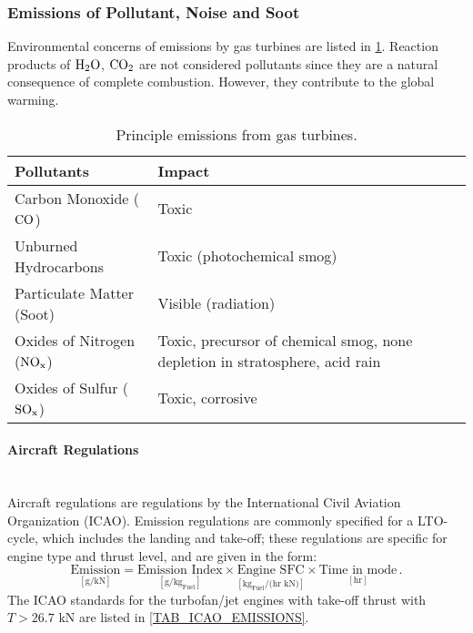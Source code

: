 \subsubsection{Emissions of Pollutant, Noise and Soot}
Environmental concerns of emissions by gas turbines are listed in \cref{TAB_EMISSIONS}. Reaction products of $\mathrm{H_2O}$, $\mathrm{CO_2}$ are not considered pollutants since they are a natural consequence of complete combustion. However, they contribute to the global warming. 
\begin{table}[!htb!]
  \begin{center}
    \begin{tabular}{|l|p{}|}\hline
    Pollutants & Impact\\\hline\hline
    Carbon Monoxide ($\mathrm{CO}$) & Toxic \\
    Unburned Hydrocarbons & Toxic (photochemical smog)\\
    Particulate Matter (Soot) & Visible (radiation)\\
    Oxides of Nitrogen ($\mathrm{NO_x}$) & Toxic, precursor of chemical smog, none depletion in stratosphere, acid rain\\
    Oxides of Sulfur ($\mathrm{SO_x}$) & Toxic, corrosive\\\hline
    \end{tabular}
    \caption{\label{TAB_EMISSIONS}Principle emissions from gas turbines.}
  \end{center}
\end{table}

\paragraph{Aircraft Regulations} \mbox{} \\[0.5em]
Aircraft regulations are regulations by the International Civil Aviation Organization (ICAO). Emission regulations are commonly specified for a LTO-cycle, which includes the landing and take-off; these regulations are specific for engine type and thrust level, and are given in the form:
\begin{equation}
  \underset{[\text{g/kN}]}{\text{Emission}} = \underset{[\text{g/kg}_\text{Fuel}]}{\text{Emission Index}} \times \underset{[\text{kg}_\text{Fuel}\text{/(hr kN)}]}{\text{Engine SFC}} \times \underset{[\text{hr}]}{\text{Time in mode}} \,.
\end{equation}
The ICAO standards for the turbofan/jet engines with take-off thrust with $T> 26.7$ kN are listed in \cref{TAB_ICAO_EMISSIONS}.

